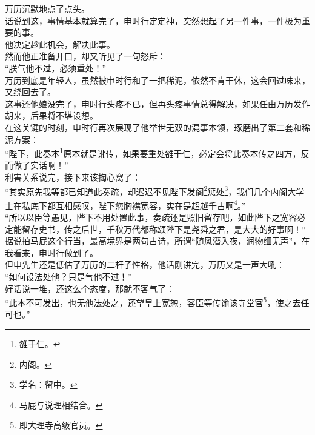 \begin{multicols}{\theparacolNo}
万历沉默地点了点头。\\

话说到这，事情基本就算完了，申时行定定神，突然想起了另一件事，一件极为重要的事。\\

他决定趁此机会，解决此事。\\

然而他正准备开口，却又听见了一句怒斥：\\

“朕气他不过，必须重处！”\\

万历到底是年轻人，虽然被申时行和了一把稀泥，依然不肯干休，这会回过味来，又绕回去了。\\

这事还他娘没完了，申时行头疼不已，但再头疼事情总得解决，如果任由万历发作胡来，后果将不堪设想。\\

在这关键的时刻，申时行再次展现了他举世无双的混事本领，琢磨出了第二套和稀泥方案：\\

“陛下，此奏本\footnote{雒于仁。}原本就是讹传，如果要重处雒于仁，必定会将此奏本传之四方，反而做了实话啊！”\\

利害关系说完，接下来该掏心窝了：\\

“其实原先我等都已知道此奏疏，却迟迟不见陛下发阁\footnote{内阁。}惩处\footnote{学名：留中。}，我们几个内阁大学士在私底下都互相感叹，陛下您胸襟宽容，实在是超越千古啊\footnote{马屁与说理相结合。}。”\\

“所以以臣等愚见，陛下不用处置此事，奏疏还是照旧留存吧，如此陛下之宽容必定能留存史书，传之后世，千秋万代都称颂陛下是尧舜之君，是大大的好事啊！”\\

据说拍马屁这个行当，最高境界是两句古诗，所谓“随风潜入夜，润物细无声”，在我看来，申时行做到了。\\

但申先生还是低估了万历的二杆子性格，他话刚讲完，万历又是一声大吼：\\

“如何设法处他？只是气他不过！”\\

好话说一堆，还这么个态度，那就不客气了：\\

“此本不可发出，也无他法处之，还望皇上宽恕，容臣等传谕该寺堂官\footnote{即大理寺高级官员。}，使之去任可也。”\\


\end{multicols}
